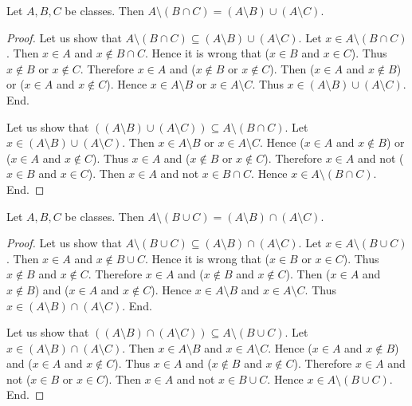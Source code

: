 \documentclass[10pt]{article}
\begin{document}
  \begin{forthel}
    \begin{proposition}[id=FOUNDATIONS_02_5296031436636160,printid]
      Let $A, B, C$ be classes.
      Then $A \setminus (B \cap C) = (A \setminus B) \cup (A \setminus C)$.
    \end{proposition}
    \begin{proof}
      Let us show that $A \setminus (B \cap C) \subseteq (A \setminus B) \cup (A \setminus C)$.
        Let $x \in A \setminus (B \cap C)$.
        Then $x \in A$ and $x \notin B \cap C$.
        Hence it is wrong that ($x \in B$ and $x \in C$).
        Thus $x \notin B$ or $x \notin C$.
        Therefore $x \in A$ and ($x \notin B$ or $x \notin C$).
        Then ($x \in A$ and $x \notin B$) or ($x \in A$ and $x \notin C$).
        Hence $x \in A \setminus B$ or $x \in A \setminus C$.
        Thus $x \in (A \setminus B) \cup (A \setminus C)$.
      End.

      Let us show that $((A \setminus B) \cup (A \setminus C)) \subseteq A \setminus (B \cap C)$. %
        Let $x \in (A \setminus B) \cup (A \setminus C)$.
        Then $x \in A \setminus B$ or $x \in A \setminus C$.
        Hence ($x \in A$ and $x \notin B$) or ($x \in A$ and $x \notin C$).
        Thus $x \in A$ and ($x \notin B$ or $x \notin C$).
        Therefore $x \in A$ and not ($x \in B$ and $x \in C$).
        Then $x \in A$ and not $x \in B \cap C$.
        Hence $x \in A \setminus (B \cap C)$.
      End.
    \end{proof}
  \end{forthel}

  \begin{forthel}
    \begin{proposition}[id=FOUNDATIONS_02_2909554153095168,printid]
      Let $A, B, C$ be classes.
      Then $A \setminus (B \cup C) = (A \setminus B) \cap (A \setminus C)$.
    \end{proposition}
    \begin{proof}
      Let us show that $A \setminus (B \cup C) \subseteq (A \setminus B) \cap (A \setminus C)$.
        Let $x \in A \setminus (B \cup C)$.
        Then $x \in A$ and $x \notin B \cup C$.
        Hence it is wrong that ($x \in B$ or $x \in C$).
        Thus $x \notin B$ and $x \notin C$.
        Therefore $x \in A$ and ($x \notin B$ and $x \notin C$).
        Then ($x \in A$ and $x \notin B$) and ($x \in A$ and $x \notin C$).
        Hence $x \in A \setminus B$ and $x \in A \setminus C$.
        Thus $x \in (A \setminus B) \cap (A \setminus C)$.
      End.

      Let us show that $((A \setminus B) \cap (A \setminus C)) \subseteq A \setminus (B \cup C)$. %
        Let $x \in (A \setminus B) \cap (A \setminus C)$.
        Then $x \in A \setminus B$ and $x \in A \setminus C$.
        Hence ($x \in A$ and $x \notin B$) and ($x \in A$ and $x \notin C$).
        Thus $x \in A$ and ($x \notin B$ and $x \notin C$).
        Therefore $x \in A$ and not ($x \in B$ or $x \in C$).
        Then $x \in A$ and not $x \in B \cup C$.
        Hence $x \in A \setminus (B \cup C)$.
      End.
    \end{proof}
  \end{forthel}
\end{document}

